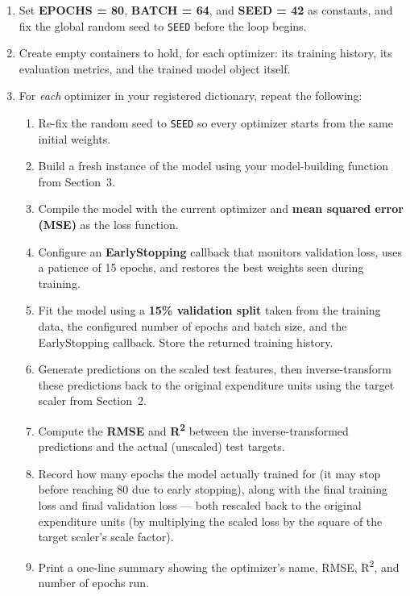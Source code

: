 \documentclass[12pt,a4paper]{article}
\begin{document}
\begin{stepbox}
\begin{enumerate}[leftmargin=*, label=\arabic*.]
  \item Set \textbf{EPOCHS = 80}, \textbf{BATCH = 64}, and \textbf{SEED = 42} as
        constants, and fix the global random seed to \texttt{SEED} before the loop
        begins.
  \item Create empty containers to hold, for each optimizer: its training history,
        its evaluation metrics, and the trained model object itself.
  \item For \emph{each} optimizer in your registered dictionary, repeat the following:
  \begin{enumerate}[leftmargin=*, label=(\alph*)]
    \item Re-fix the random seed to \texttt{SEED} so every optimizer starts from the
          same initial weights.
    \item Build a fresh instance of the model using your model-building function from
          Section~3.
    \item Compile the model with the current optimizer and \textbf{mean squared error
          (MSE)} as the loss function.
    \item Configure an \textbf{EarlyStopping} callback that monitors validation loss,
          uses a patience of 15 epochs, and restores the best weights seen
          during training.
    \item Fit the model using a \textbf{15\% validation split} taken from the training
          data, the configured number of epochs and batch size, and the EarlyStopping
          callback. Store the returned training history.
    \item Generate predictions on the scaled test features, then inverse-transform
          these predictions back to the original expenditure units using the target
          scaler from Section~2.
    \item Compute the \textbf{RMSE} and \textbf{R\textsuperscript{2}} between the
          inverse-transformed predictions and the actual (unscaled) test targets.
    \item Record how many epochs the model actually trained for (it may stop before
          reaching 80 due to early stopping), along with the final training loss and
          final validation loss — both rescaled back to the original expenditure units
          (by multiplying the scaled loss by the square of the target scaler's scale
          factor).
    \item Print a one-line summary showing the optimizer's name, RMSE, R\textsuperscript{2},
          and number of epochs run.
  \end{enumerate}
\end{enumerate}
\end{stepbox}
\end{document}
